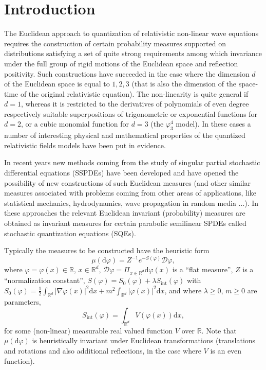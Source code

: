 \documentclass[a4paper,10pt]{article}
\newcommand{\mathd}{\mathrm{d}}
\newcommand{\tmop}[1]{\ensuremath{\operatorname{#1}}}
\newcommand{\textdots}[0]{...}
\begin{document}
{\tableofcontents}

\section{Introduction}

The Euclidean approach to quantization of relativistic non-linear wave
equations requires the construction of certain probability measures supported
on distributions satisfying a set of quite strong requirements among which
invariance under the full group of rigid motions of the Euclidean space and
reflection positivity. Such constructions have succeeded in the case where the
dimension $d$ of the Euclidean space is equal to $1, 2, 3$ (that is also the
dimension of the space-time of the original relativistic equation). The
non-linearity is quite general if $d = 1$, whereas it is restricted to the
derivatives of polynomials of even degree respectively suitable superpositions
of trigonometric or exponential functions for $d = 2$, or a cubic monomial
function for $d = 3$ (the $\varphi^4_3$ model). In these cases a number of
interesting physical and mathematical properties of the quantized relativistic
fields models have been put in evidence.

In recent years new methods coming from the study of singular partial
stochastic differential equations (SSPDEs) have been developed and have opened
the possibility of new constructions of such Euclidean measures (and other
similar measures associated with problems coming from other areas of
applications, like statistical mechanics, hydrodynamics, wave propagation in
random media {\textdots}). In these approaches the relevant Euclidean
invariant (probability) measures are obtained as invariant measures for
certain parabolic semilinear SPDEs called stochastic quantization equations
(SQEs).

Typically the measures to be constructed have the heuristic form
\[ \mu (\mathd \varphi) = Z^{- 1} e^{- S (\varphi)} \mathcal{D} \varphi, \]
where $\varphi = \varphi (x) \in \mathbb{R}$, $x \in \mathbb{R}^d$,
$\mathcal{D} \varphi = \Pi_{x \in \mathbb{R}^d} \mathd \varphi (x)$ is a
``flat measure'', $Z$ is a ``normalization constant'', $S (\varphi) = S_0
(\varphi) + \lambda S_{\tmop{int}} (\varphi)$ with $S_0 (\varphi) =
\frac{1}{2} \int_{\mathbb{R}^d} | \nabla \varphi (x) |^2 \mathd x + m^2
\int_{\mathbb{R}^d} | \varphi (x) |^2 \mathd x$, and where $\lambda \geqslant
0$, $m \geqslant 0$ are parameters,
\[ S_{\tmop{int}} (\varphi) = \int_{\mathbb{R}^d} V (\varphi (x)) \mathd x, \]
for some (non-linear) measurable real valued function $V$ over $\mathbb{R}$.
Note that $\mu (\mathd \varphi)$ is heuristically invariant under Euclidean
transformations (translations and rotations and also additional reflections,
in the case where $V$ is an even function).
\end{document}

